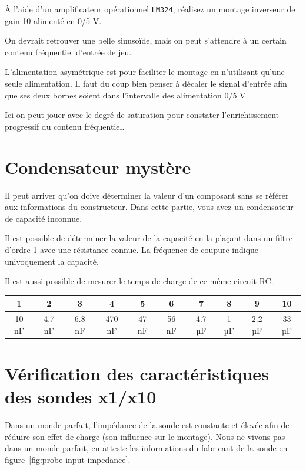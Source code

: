 \documentclass{../template/labo}
\begin{document}
À l'aide d'un amplificateur opérationnel \texttt{LM324}, réalisez un montage inverseur de gain 10 alimenté en 0/5 V.

{
	On devrait retrouver une belle sinusoïde, mais on peut s'attendre à un certain contenu fréquentiel d'entrée de jeu.

	L'alimentation asymétrique est pour faciliter le montage en n'utilisant qu'une seule alimentation.
	Il faut du coup bien penser à décaler le signal d'entrée afin que ses deux bornes soient dans l'intervalle des alimentation 0/5 V.
}

{
	Ici on peut jouer avec le degré de saturation pour constater l'enrichissement progressif du contenu fréquentiel.
}


\section{Condensateur mystère}
Il peut arriver qu'on doive déterminer la valeur d'un composant sans se référer aux informations du constructeur.
Dans cette partie, vous avez un condensateur de capacité inconnue.

{
	Il est possible de déterminer la valeur de la capacité en la plaçant dans un filtre d'ordre 1 avec une résistance connue. La fréquence de coupure indique univoquement la capacité.

	Il est aussi possible de mesurer le temps de charge de ce même circuit RC.

	\begin{center}
		\begin{tabular}{|c|c|c|c|c|c|c|c|c|c|}
		1 		& 2 		& 3 			& 4 		& 5 		& 6 		& 7 			& 8 	& 9 			& 10 \\
		\hline
		10 nF & 4.7 nF & 6.8 nF & 470 nF & 47 nF & 56 nF & 4.7 µF & 1 µF & 2.2 µF & 33 µF \\
		\end{tabular}
	\end{center}
}


\section{Vérification des caractéristiques des sondes x1/x10}
Dans un monde parfait, l'impédance de la sonde est constante et élevée afin de réduire son effet de charge (son influence sur le montage).
Nous ne vivons pas dans un monde parfait, en atteste les informations du fabricant de la sonde en figure~\ref{fig:probe-input-impedance}.
\end{document}
